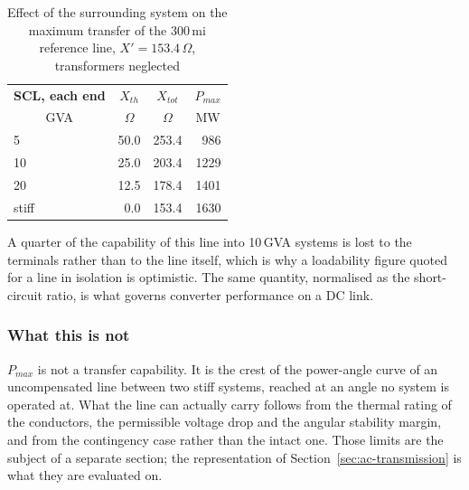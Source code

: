 \begin{table}[!ht]
  \centering
  \begin{tabular}{@{}l r r r@{}}
    \toprule
    \textbf{SCL, each end} & \multicolumn{1}{c}{\textbf{$X_{th}$}}
      & \multicolumn{1}{c}{\textbf{$X_{tot}$}}
      & \multicolumn{1}{c}{\textbf{$P_{max}$}} \\
    \multicolumn{1}{c}{GVA} & \multicolumn{1}{c}{$\Omega$}
      & \multicolumn{1}{c}{$\Omega$} & \multicolumn{1}{c}{MW} \\
    \midrule
    5      & 50.0 & 253.4 &  986 \\
    10     & 25.0 & 203.4 & 1229 \\
    20     & 12.5 & 178.4 & 1401 \\
    stiff  &  0.0 & 153.4 & 1630 \\
    \bottomrule
  \end{tabular}
  \caption{Effect of the surrounding system on the maximum transfer of the
           300\,mi reference line, $X' = 153.4\,\Omega$, transformers
           neglected}
  \label{tab:ref-scr}
\end{table}

A quarter of the capability of this line into 10\,GVA systems is lost to the
terminals rather than to the line itself, which is why a loadability figure
quoted for a line in isolation is optimistic. The same quantity, normalised
as the short-circuit ratio, is what governs converter performance on a DC
link.

\subsubsection{What this is not}
\label{sec:ref-caveat}

$P_{max}$ is not a transfer capability. It is the crest of the power-angle
curve of an uncompensated line between two stiff systems, reached at an
angle no system is operated at. What the line can actually carry follows
from the thermal rating of the conductors, the permissible voltage drop and
the angular stability margin, and from the contingency case rather than the
intact one. Those limits are the subject of a separate section; the
representation of Section~\ref{sec:ac-transmission} is what they are
evaluated on.

\FloatBarrier
